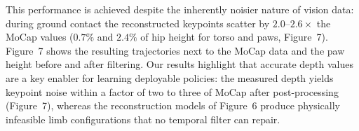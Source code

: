 This performance is achieved despite the inherently noisier nature of vision data: during ground contact the reconstructed keypoints scatter by $2.0$--$2.6\times$ the MoCap values ($0.7\%$ and $2.4\%$ of hip height for torso and paws, Figure~7).
Figure~7 shows the resulting trajectories next to the MoCap data and the paw height before and after filtering.
Our results highlight that accurate depth values are a key enabler for learning deployable policies: the measured depth yields keypoint noise within a factor of two to three of MoCap after post-processing (Figure~7), whereas the reconstruction models of Figure~6 produce physically infeasible limb configurations that no temporal filter can repair.

